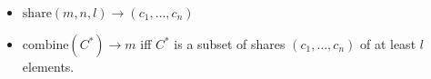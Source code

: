 \begin{itemize}
    \item $\mathrm{share}(m, n, l)\to (c_1,\dots,c_n)$
    \item $\mathrm{combine}(C^*)\to m$ iff $C^*$ is a subset of shares $(c_1, \dots, c_n)$ of at least $l$ elements.
\end{itemize}